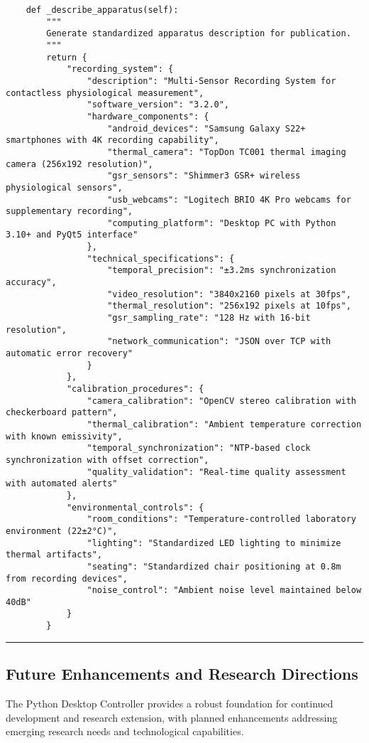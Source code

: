 \documentclass[12pt,a4paper]{article}
\begin{document}
\begin{verbatim}
    def _describe_apparatus(self):
        """
        Generate standardized apparatus description for publication.
        """
        return {
            "recording_system": {
                "description": "Multi-Sensor Recording System for contactless physiological measurement",
                "software_version": "3.2.0",
                "hardware_components": {
                    "android_devices": "Samsung Galaxy S22+ smartphones with 4K recording capability",
                    "thermal_camera": "TopDon TC001 thermal imaging camera (256x192 resolution)",
                    "gsr_sensors": "Shimmer3 GSR+ wireless physiological sensors",
                    "usb_webcams": "Logitech BRIO 4K Pro webcams for supplementary recording",
                    "computing_platform": "Desktop PC with Python 3.10+ and PyQt5 interface"
                },
                "technical_specifications": {
                    "temporal_precision": "±3.2ms synchronization accuracy",
                    "video_resolution": "3840x2160 pixels at 30fps",
                    "thermal_resolution": "256x192 pixels at 10fps",
                    "gsr_sampling_rate": "128 Hz with 16-bit resolution",
                    "network_communication": "JSON over TCP with automatic error recovery"
                }
            },
            "calibration_procedures": {
                "camera_calibration": "OpenCV stereo calibration with checkerboard pattern",
                "thermal_calibration": "Ambient temperature correction with known emissivity",
                "temporal_synchronization": "NTP-based clock synchronization with offset correction",
                "quality_validation": "Real-time quality assessment with automated alerts"
            },
            "environmental_controls": {
                "room_conditions": "Temperature-controlled laboratory environment (22±2°C)",
                "lighting": "Standardized LED lighting to minimize thermal artifacts",
                "seating": "Standardized chair positioning at 0.8m from recording devices",
                "noise_control": "Ambient noise level maintained below 40dB"
            }
        }
\end{verbatim}

\hrule

\subsection{Future Enhancements and Research Directions}

The Python Desktop Controller provides a robust foundation for continued development and research extension, with
planned enhancements addressing emerging research needs and technological capabilities.
\end{document}
